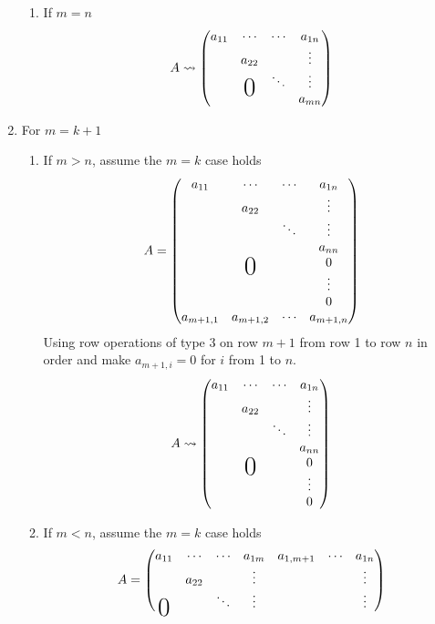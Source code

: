 \begin{enumerate}
\begin{enumerate}
\item If $m=n$
\begin{equation}
A \leadsto \begin{pmatrix}
a_{11} & \cdots & \cdots & a_{1n}\\
      & a_{22}& & \vdots\\
& \bigzero & \ddots& \vdots\\
& & & a_{mn}
\end{pmatrix}
\end{equation}
\end{enumerate}
\item For $m = k + 1$
\begin{enumerate}
\item If $m > n$, assume the $m=k$ case holds
\begin{equation}
A =
\begin{pmatrix}
a_{11} & \cdots & \cdots & a_{1n}\\
& a_{22} & & \vdots\\
& & \ddots & \vdots\\
& & & a_{nn}\\
&\bigzero & & 0\\
& & & \vdots\\
& & & 0\\
a_{m+1,1} & a_{m+1,2} & \cdots & a_{m+1,n}
\end{pmatrix}
\end{equation}
\newpage{}
Using row operations of type 3 on row $m+1$ from row 1 to row $n$ in
order and make $a_{m+1,i} =0$ for $i$ from 1 to $n$.
\begin{equation}
A \leadsto \begin{pmatrix}
a_{11} & \cdots & \cdots & a_{1n}\\
& a_{22} & & \vdots\\
& & \ddots & \vdots\\
& & & a_{nn}\\
&\bigzero & & 0\\
& & & \vdots\\
& & & 0
\end{pmatrix}
\end{equation}
\item If $m < n$, assume the $m=k$ case holds
\begin{equation}
A =
\begin{pmatrix}
a_{11} & \cdots & \cdots & a_{1m} & a_{1,m+1} & \cdots & a_{1n}\\
& a_{22} & & \vdots &  & & \vdots\\
\bigzero& & \ddots & \vdots&  & & \vdots\\

\end{pmatrix}
\end{equation}
\end{enumerate}
\end{enumerate}
